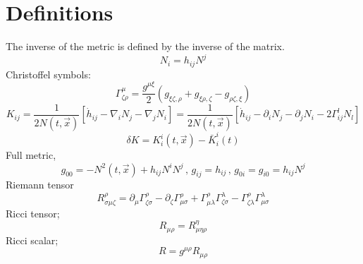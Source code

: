 \documentclass[a4paper,11pt]{article}
\def\be{\begin{equation}}
\def\ee{\end{equation}}
\begin{document}
  \section{Definitions}
 The inverse of the metric is defined by the inverse of the  matrix.
\be
N_i=h_{ij} N^j
\ee
Christoffel symbols:
\be
\Gamma_{\zeta \rho}^{\mu}= \frac{g^{\mu \xi }}{2} \left(  g_{\xi \zeta ,\rho }+ g_{\xi \rho ,\zeta } - g_{\rho \zeta ,\xi }   \right )
\ee
\be
K_{ij}=\frac{1}{2 N (t,\vec{x})} \left [  \dot{h}_{ij} - \nabla_{i} N_{j} - \nabla_{j} N_{i}  \right ]= \frac{1}{2 N (t,\vec{x})} \left [  \dot{h}_{ij} - \partial_{i} N_{j} - \partial_{j} N_{i} -2  \Gamma_{i j}^{l} N_l  \right ] 
\ee
\be
\delta K= K_i^i(t,\vec{x}) -\bar {K}_i^i (t)
\ee
Full metric,
\be
g_{00}= -N^2(t,\vec{x})+ h_{ij} N^i N^j \,,\, g_{ij}=h_{ij} \, , \, g_{0i}=g_{i0}=h_{ij}N^j
\ee
Riemann tensor
\be
R^{\rho}_{\sigma \mu \zeta}= \partial_{\mu} \Gamma_{\zeta \sigma}^{\rho}- \partial_{\zeta} \Gamma_{\mu \sigma}^{\rho} + \Gamma_{\mu \lambda}^{\rho} \Gamma_{\zeta \sigma}^{\lambda} -  \Gamma_{\zeta \lambda}^{\rho} \Gamma_{\mu \sigma}^{\lambda}
\ee
Ricci tensor;
\be
R_{\mu \rho}=R ^{\eta}_{\mu  \eta  \rho}
\ee
Ricci scalar;
\be
R=g^{\mu \rho} R_{\mu \rho}
\ee
 
\end{document}
